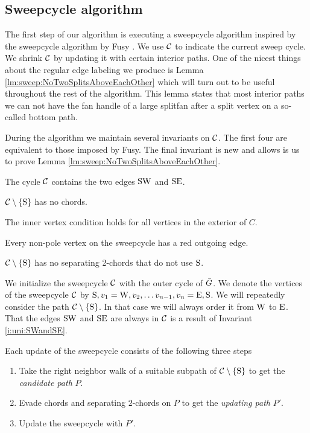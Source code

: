 
\subsection{Sweepcycle algorithm}
\thispagestyle{plain}
\label{ss:sweep}
The first step of our algorithm is executing a sweepcycle algorithm inspired by the sweepcycle algorithm by Fusy \cite{Fusy2006}. We use $\mathcal{C}$ to indicate the current sweep cycle. We shrink $\mathcal{C}$ by updating it with certain interior paths.
One of the nicest things about the regular edge labeling we produce is Lemma \ref{lm:sweep:NoTwoSplitsAboveEachOther} which will turn out to be useful throughout the rest of the algorithm. This lemma states that most interior paths we can not have the fan handle of a large splitfan after a split vertex on a so-called bottom path. 

During the algorithm we maintain several invariants on $\mathcal{C}$. The first four are equivalent to those imposed by Fusy. The final invariant is new and allows is us to prove Lemma \ref{lm:sweep:NoTwoSplitsAboveEachOther}.

\begin{invariants}
  \itemsep=-4pt
  \item \label{i:uni:SWandSE} The cycle $\mathcal{C}$ contains the two edges $\mathrm{S} \mathrm{W}$ and $\mathrm{S} \mathrm{E}$.
  \item \label{i:uni:noChords} $\mathcal{C} \setminus \left\lbrace {\mathrm{S}} \right\rbrace$ has no chords.
  \item \label{i:uni:intVertCond} The inner vertex condition holds for all vertices in the exterior of $C$.
  \item \label{i:uni:redOutgoing} Every non-pole vertex on the sweepcycle has a red outgoing edge.
  \item \label{i:uni:no2Chords} $\mathcal{C}\setminus \left\lbrace {\mathrm{S}} \right\rbrace$ has no separating 2-chords that do not use $\mathrm{S}$.
\end{invariants}

We initialize the sweepcycle $\mathcal{C}$ with the outer cycle of $\bar{G}$.
We denote the vertices of the sweepcycle $\mathcal{C}$ by $\mathrm{S}, v_1 = \mathrm{W}, v_2, \ldots v_{n-1}, v_n = \mathrm{E}, \mathrm{S}$.   We will repeatedly consider the path $\mathcal{C} \setminus \left\lbrace {\mathrm{S}} \right\rbrace$. In that case we will always order it from $\mathrm{W}$ to $\mathrm{E}$. That the edges $\mathrm{S} \mathrm{W}$ and $\mathrm{S} \mathrm{E}$ are always in $\mathcal{C}$ is a result of Invariant \ref{i:uni:SWandSE}.


Each update of the sweepcycle consists of the following three steps
\begin{enumerate}
  \itemsep=-4pt
  \item Take the right neighbor walk of a suitable subpath of $\mathcal{C} \setminus \left\lbrace {\mathrm{S}} \right\rbrace$ to get the \emph{candidate path} $P$.
  \item Evade chords and separating $2$-chords on $P$ to get the \emph{updating path} $P'$.
  \item Update the sweepcycle with $P'$.
\end{enumerate}

